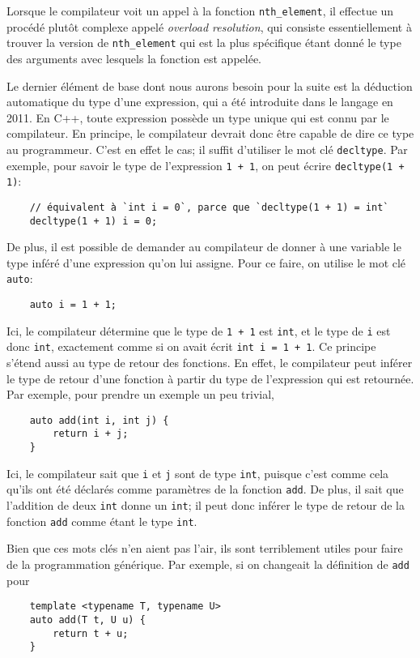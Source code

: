 Lorsque le compilateur voit un appel à la fonction {\tt nth\_element}, il
effectue un procédé plutôt complexe appelé \textit{overload resolution}, qui
consiste essentiellement à trouver la version de {\tt nth\_element} qui est
la plus spécifique étant donné le type des arguments avec lesquels la fonction
est appelée.

Le dernier élément de base dont nous aurons besoin pour la suite est la
déduction automatique du type d'une expression, qui a été introduite dans
le langage en 2011. En C++, toute expression possède un type unique qui est
connu par le compilateur. En principe, le compilateur devrait donc être
capable de dire ce type au programmeur. C'est en effet le cas; il suffit
d'utiliser le mot clé {\tt decltype}. Par exemple, pour savoir le type de
l'expression {\tt 1 + 1}, on peut écrire {\tt decltype(1 + 1)}:
\begin{verbatim}
    // équivalent à `int i = 0`, parce que `decltype(1 + 1) = int`
    decltype(1 + 1) i = 0;
\end{verbatim}

De plus, il est possible de demander au compilateur de donner à une variable
le type inféré d'une expression qu'on lui assigne. Pour ce faire, on utilise
le mot clé {\tt auto}:
\begin{verbatim}
    auto i = 1 + 1;
\end{verbatim}

Ici, le compilateur détermine que le type de {\tt 1 + 1} est {\tt int}, et
le type de {\tt i} est donc {\tt int}, exactement comme si on avait écrit
{\tt int i = 1 + 1}. Ce principe s'étend aussi au type de retour des fonctions.
En effet, le compilateur peut inférer le type de retour d'une fonction à partir
du type de l'expression qui est retournée. Par exemple, pour prendre un exemple
un peu trivial,
\begin{verbatim}
    auto add(int i, int j) {
        return i + j;
    }
\end{verbatim}

Ici, le compilateur sait que {\tt i} et {\tt j} sont de type {\tt int},
puisque c'est comme cela qu'ils ont été déclarés comme paramètres de la
fonction {\tt add}. De plus, il sait que l'addition de deux {\tt int} donne
un {\tt int}; il peut donc inférer le type de retour de la fonction {\tt add}
comme étant le type {\tt int}.

Bien que ces mots clés n'en aient pas l'air, ils sont terriblement utiles pour
faire de la programmation générique. Par exemple, si on changeait la définition
de {\tt add} pour
\begin{verbatim}
    template <typename T, typename U>
    auto add(T t, U u) {
        return t + u;
    }
\end{verbatim}

